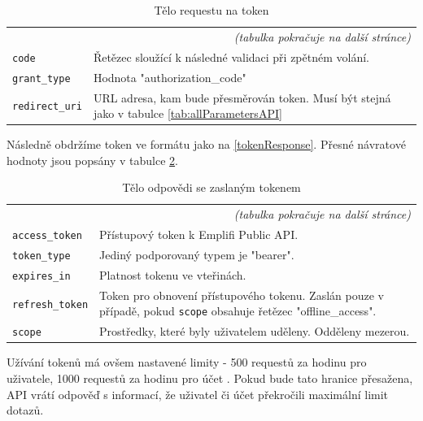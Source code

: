 \documentclass[czech, bc, kiv, he, iso690numb]{fasthesis}
\begin{document}
\begin{center}
	\begin{longtable}{p{}p{}}
	\caption{Tělo requestu na token \cite{emplifiDocs}}
	\label{tab:exampleRequestBody}\\
	\toprule[1.5pt]
	\endhead
	\midrule
	\multicolumn{2}{r}{\textit{(tabulka pokračuje na další stránce)}}\\
	\endfoot
	\bottomrule[1.5pt]
	\endlastfoot
	\verb"code" & Řetězec sloužící k následné validaci při zpětném volání. \\
	\midrule
	\verb"grant_type" & Hodnota "authorization\_code" \\
	\midrule
	\verb"redirect_uri" & URL adresa, kam bude přesměrován token. Musí být stejná jako v tabulce \ref{tab:allParametersAPI} \\
	\end{longtable}
\end{center}

Následně obdržíme token ve formátu jako na \ref{tokenResponse}. Přesné návratové hodnoty jsou popsány v tabulce \ref{tab:exampleRequestResponse}.

\begin{center}
	\begin{longtable}{p{}p{}}
	\caption{Tělo odpovědi se zaslaným tokenem \cite{emplifiDocs}}
	\label{tab:exampleRequestResponse}\\
	\toprule[1.5pt]
	\endhead
	\midrule
	\multicolumn{2}{r}{\textit{(tabulka pokračuje na další stránce)}}\\
	\endfoot
	\bottomrule[1.5pt]
	\endlastfoot
	\verb"access_token" & Přístupový token k Emplifi Public API. \\
	\midrule
	\verb"token_type" & Jediný podporovaný typem je "bearer". \\
	\midrule
	\verb"expires_in" & Platnost tokenu ve vteřinách. \\
	\midrule
	\verb"refresh_token" & Token pro obnovení přístupového tokenu. Zaslán pouze v případě, pokud \verb"scope" obsahuje řetězec "offline\_access".\\
	\midrule
	\verb"scope" & Prostředky, které byly uživatelem uděleny. Odděleny mezerou. \\
	\end{longtable}
\end{center}



Užívání tokenů má ovšem nastavené limity - 500 requestů za hodinu pro uživatele, 1000 requestů za hodinu pro účet \cite{emplifiDocs}. Pokud bude tato hranice přesažena,
API vrátí odpověď s informací, že uživatel či účet překročili maximální limit dotazů.
\end{document}
